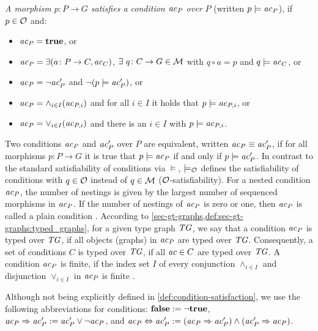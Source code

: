 \begin{definition}
\noindent
\emph{A morphism $p \colon P \to G$ satisfies a condition $\mathit{ac}_P$ over $P$} (written $p \models \mathit{ac}_P$), if $p \in {\cal O}$ and:
\begin{itemize}
	\item $\mathit{ac}_P = \textbf{true}$, or
	\item $\mathit{ac}_P = \exists(a \colon P \to C,\mathit{ac}_C)$,  $\exists \ q \colon C \to G \in {\cal M}$ with $q \circ a = p$ and $q \models \mathit{ac}_C$, or
	\item $\mathit{ac}_P = \neg \mathit{ac}'_P$ and $\neg (p \models \mathit{ac}'_P)$, or
	\item $\mathit{ac}_P = \wedge_{i \in I} (\mathit{ac}_{P,i})$ and for all $i \in I$ it holds that $p \models \mathit{ac}_{P,i}$, or 
	\item $\mathit{ac}_P = \vee_{i \in I} (\mathit{ac}_{P,i})$ and there is an $i \in I$ with $p \models \mathit{ac}_{P,i}$.
\end{itemize}
Two conditions $\mathit{ac}_P$ and $\mathit{ac}'_P$ over $P$ are equivalent, written $\mathit{ac}_P \equiv \mathit{ac}'_P$, if for all morphisms $p\colon P \to G$ it is true that $p \models \mathit{ac}_P$ if and only if $p \models \mathit{ac}'_P$.
In contrast to the standard satisfiability of conditions via $\models$, $\models_{{\cal O}}$ defines the satisfiability of conditions with $q \in {\cal O}$ instead of $q \in {\cal M}$ (${\cal O}$-satisfiability).
For a nested condition $\mathit{ac}_P$, the number of nestings is given by the largest number of sequenced morphisms in $\mathit{ac}_P$.
If the number of nestings of $\mathit{ac}_P$ is zero or one, then $\mathit{ac}_P$ is called a plain condition .
According to \cref{sec-gt-graphs,def:sec-gt-graphs:typed_graphs}, for a given type graph $\mathit{TG}$, we say that a condition $\mathit{ac}_P$ is typed over $\mathit{TG}$, if all objects (graphs) in $\mathit{ac}_P$ are typed over $\mathit{TG}$.
Consequently, a set of conditions $C$ is typed over $\mathit{TG}$, if all $\mathit{ac} \in C$ are typed over $\mathit{TG}$.
A condition $\mathit{ac}_P$ is finite, if the index set $I$ of every conjunction $\wedge_{i \in I}$ and disjunction $\vee_{i \in I}$ in $\mathit{ac}_P$ is finite \cite{DBLP:journals/mscs/HabelP09}.
\envEndMarker
\end{definition}

\begin{remark}
Although not being explicitly defined in \cref{def:condition-satisfaction}, we use the following abbreviations for conditions: $\textbf{false}:=\neg\textbf{true}$, $\mathit{ac}_P \Rightarrow \mathit{ac}'_P:=\mathit{ac}'_P \vee \neg\mathit{ac}_P$, and $\mathit{ac}_P \Leftrightarrow \mathit{ac}'_P:=(\mathit{ac}_P \Rightarrow \mathit{ac}'_P) \wedge (\mathit{ac}'_P \Rightarrow \mathit{ac}_P)$.
\envEndMarker
\end{remark}

